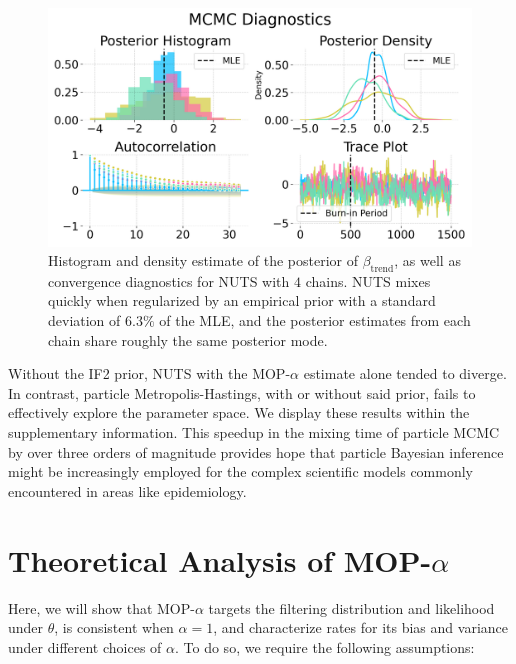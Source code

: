 \documentclass[9pt,twocolumn,pnasresearcharticle]{pnas-new}
\newcommand\arxiv[2]{#2} %
\begin{document}
\begin{figure}[t!]
    \centering
    \includegraphics[width=\arxiv{\textwidth/\real{1.25}}{\textwidth/\real{2.5}}]{imgs/pmcmc/nuts_eb.png}
    \arxiv{}{\vspace*{-1mm}}
    \caption{Histogram and density estimate of the posterior of $\beta_{\text{trend}}$, as well as convergence diagnostics for NUTS with $4$ chains. NUTS mixes quickly when regularized by an empirical prior with a standard deviation of $6.3\%$ of the MLE, and the posterior estimates from each chain share roughly the same posterior mode.}
    \label{fig:nuts-eb}
    \arxiv{}{\vspace*{-4mm}}
\end{figure}

Without the IF2 prior, NUTS with the MOP-$\alpha$ estimate alone tended to diverge.
In contrast, particle Metropolis-Hastings, with or without said prior, fails to effectively explore the parameter space.
We display these results \arxiv{in Figures \ref{fig:mh} and \ref{fig:nuts} in Appendix~\ref{appendix:bayes}}{within the supplementary information}. 
This speedup in the mixing time of particle MCMC by over three orders of magnitude provides hope that particle Bayesian inference might be increasingly employed for the complex scientific models commonly encountered in areas like epidemiology.

\arxiv{}{\vspace*{-2mm}}
\section{Theoretical Analysis of MOP-$\alpha$}
\label{sec:thms}

Here, we will show that MOP-$\alpha$ targets the filtering distribution and likelihood under $\theta$, is consistent when $\alpha=1$, and characterize rates for its bias and variance under different choices of $\alpha$. To do so, we require the following assumptions:
\end{document}
